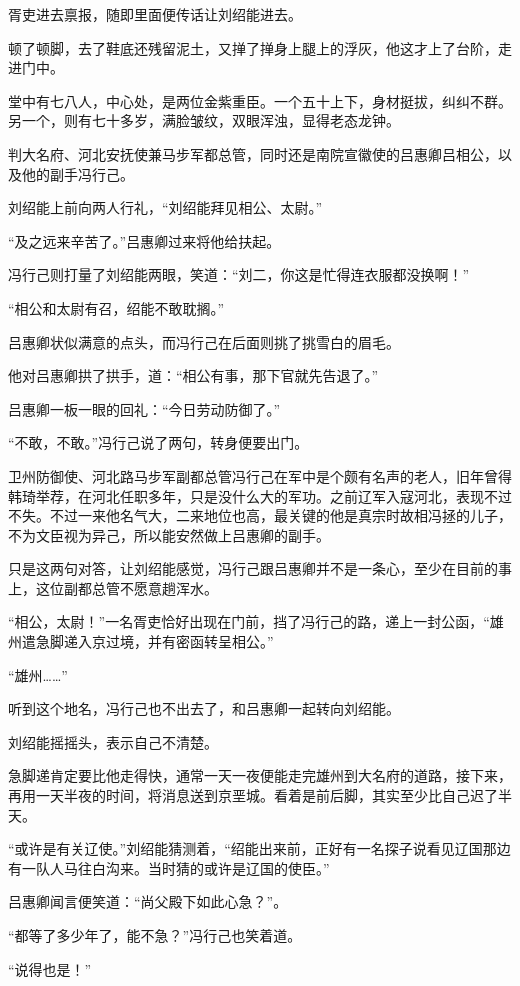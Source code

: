 胥吏进去禀报，随即里面便传话让刘绍能进去。

顿了顿脚，去了鞋底还残留泥土，又掸了掸身上腿上的浮灰，他这才上了台阶，走进门中。

堂中有七八人，中心处，是两位金紫重臣。一个五十上下，身材挺拔，纠纠不群。另一个，则有七十多岁，满脸皱纹，双眼浑浊，显得老态龙钟。

判大名府、河北安抚使兼马步军都总管，同时还是南院宣徽使的吕惠卿吕相公，以及他的副手冯行己。

刘绍能上前向两人行礼，“刘绍能拜见相公、太尉。”

“及之远来辛苦了。”吕惠卿过来将他给扶起。

冯行己则打量了刘绍能两眼，笑道：“刘二，你这是忙得连衣服都没换啊！”

“相公和太尉有召，绍能不敢耽搁。”

吕惠卿状似满意的点头，而冯行己在后面则挑了挑雪白的眉毛。

他对吕惠卿拱了拱手，道：“相公有事，那下官就先告退了。”

吕惠卿一板一眼的回礼：“今日劳动防御了。”

“不敢，不敢。”冯行己说了两句，转身便要出门。

卫州防御使、河北路马步军副都总管冯行己在军中是个颇有名声的老人，旧年曾得韩琦举荐，在河北任职多年，只是没什么大的军功。之前辽军入寇河北，表现不过不失。不过一来他名气大，二来地位也高，最关键的他是真宗时故相冯拯的儿子，不为文臣视为异己，所以能安然做上吕惠卿的副手。

只是这两句对答，让刘绍能感觉，冯行己跟吕惠卿并不是一条心，至少在目前的事上，这位副都总管不愿意趟浑水。

“相公，太尉！”一名胥吏恰好出现在门前，挡了冯行己的路，递上一封公函，“雄州遣急脚递入京过境，并有密函转呈相公。”

“雄州……”

听到这个地名，冯行己也不出去了，和吕惠卿一起转向刘绍能。

刘绍能摇摇头，表示自己不清楚。

急脚递肯定要比他走得快，通常一天一夜便能走完雄州到大名府的道路，接下来，再用一天半夜的时间，将消息送到京垩城。看着是前后脚，其实至少比自己迟了半天。

“或许是有关辽使。”刘绍能猜测着，“绍能出来前，正好有一名探子说看见辽国那边有一队人马往白沟来。当时猜的或许是辽国的使臣。”

吕惠卿闻言便笑道：“尚父殿下如此心急？”。

“都等了多少年了，能不急？”冯行己也笑着道。

“说得也是！”

